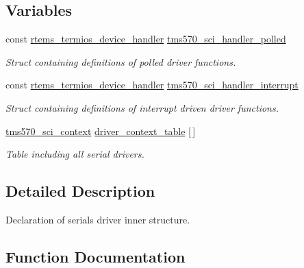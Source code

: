 \subsection*{Variables}
\begin{DoxyCompactItemize}
\item 
const \mbox{\hyperlink{structrtems__termios__device__handler}{rtems\+\_\+termios\+\_\+device\+\_\+handler}} \mbox{\hyperlink{tms570-sci-driver_8h_a2f9036d4d7c7c5dcb9068422928da97a}{tms570\+\_\+sci\+\_\+handler\+\_\+polled}}
\begin{DoxyCompactList}\small\item\em Struct containing definitions of polled driver functions. \end{DoxyCompactList}\item 
const \mbox{\hyperlink{structrtems__termios__device__handler}{rtems\+\_\+termios\+\_\+device\+\_\+handler}} \mbox{\hyperlink{tms570-sci-driver_8h_afc72c833e5a0309b5716223987446713}{tms570\+\_\+sci\+\_\+handler\+\_\+interrupt}}
\begin{DoxyCompactList}\small\item\em Struct containing definitions of interrupt driven driver functions. \end{DoxyCompactList}\item 
\mbox{\hyperlink{structtms570__sci__context}{tms570\+\_\+sci\+\_\+context}} \mbox{\hyperlink{tms570-sci-driver_8h_a6162f56b8d4e448ce7f72275b7bdc039}{driver\+\_\+context\+\_\+table}} \mbox{[}$\,$\mbox{]}
\begin{DoxyCompactList}\small\item\em Table including all serial drivers. \end{DoxyCompactList}\end{DoxyCompactItemize}


\subsection{Detailed Description}
Declaration of serial\textquotesingle{}s driver inner structure. 



\subsection{Function Documentation}
\mbox{\label{tms570-sci-driver_8h_a73848a263fd0b87c4ab8f1e151239fc5}} 
